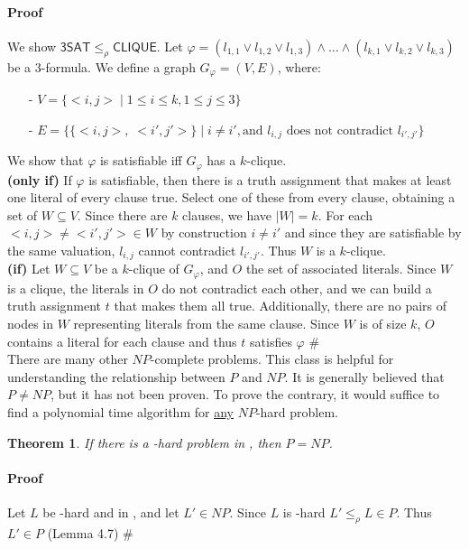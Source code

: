 \documentclass{report}
\newcommand{\NP}{\text{$\mathit{NP}$}\xspace}
\newcommand{\Po}{\text{$\mathit{P}$}\xspace}
\newtheorem{theorem}[definition]{Theorem}
\begin{document}
\paragraph{Proof} We show $\mathsf{3SAT} \leq_\rho \mathsf{CLIQUE}$. Let $\varphi = (l_{1,1} \lor l_{1,2} \lor l_{1,3}) \land \dots \land (l_{k,1} \lor l_{k,2} \lor l_{k,3})$ be a 3-formula. We define a graph $G_\varphi = (V,E)$, where:
\begin{itemize}
\item[-] $V = \{ <i,j>\;|\;1\leq i \leq k, 1\leq j \leq 3\}$
\item[-] $E = \{\{<i,j>,\;<i',j'>\}\;|\;i\neq i', \text{and }l_{i,j} \text{ does not contradict }l_{i',j'}\}$
\end{itemize}
We show that $\varphi$ is satisfiable iff $G_\varphi$ has a $k$-clique.\\
\textbf{(only if)} If $\varphi$ is satisfiable, then there is a truth assignment that makes at least one literal of every clause true. Select one of these from every clause, obtaining a set of $W\subseteq V$. Since there are $k$ clauses, we have $|W| = k$. For each $<i,j>\neq<i',j'> \in W$ by construction $i\neq i'$ and since they are satisfiable by the same valuation, $l_{i,j}$ cannot contradict $l_{i',j'}$. Thus $W$ is a $k$-clique.\\
\textbf{(if)} Let $W \subseteq V$ be a $k$-clique of $G_\varphi$, and $O$ the set of associated literals. Since $W$ is a clique, the literals in $O$ do not contradict each other, and we can build a truth assignment $t$ that makes them all true. Additionally, there are no pairs of nodes in $W$ representing literals from the same clause. Since $W$ is of size $k$, $O$ contains a  literal for each clause and thus $t$ satisfies $\varphi$ \#\\

There are many other $NP$-complete problems. This class is helpful for understanding the relationship between $P$ and $NP$. It is generally believed that $P \neq NP$, but it has not been proven. To prove the contrary, it would suffice to find a polynomial time algorithm for \underline{any} $NP$-hard problem.

\begin{theorem}If there is a \NP-hard problem in \Po, then $\Po=\NP$.
\end{theorem}

\paragraph{Proof}Let $L$ be \NP-hard and in \Po, and let $L' \in \NP$. Since $L$ is \NP-hard $L' \leq_\rho L \in \Po$. Thus $L' \in \Po$ (Lemma 4.7) \#\\
\end{document}
